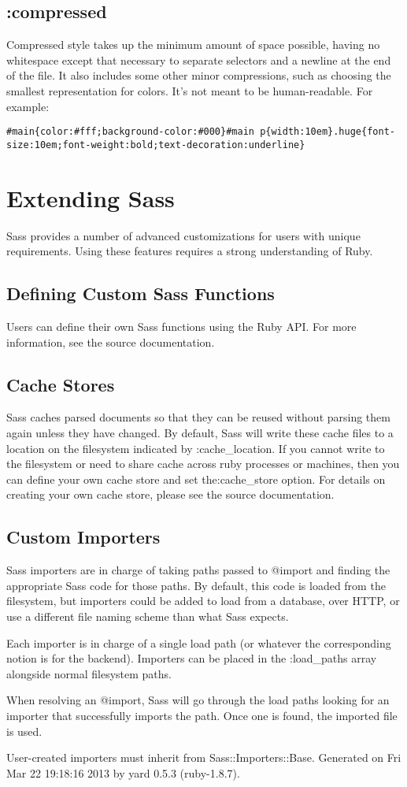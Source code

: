 \documentclass[9pt]{article}
\begin{document}
\subsection{:compressed}


 Compressed style takes up the minimum amount of space possible, having no whitespace except that necessary to separate selectors and a newline at the end of the file. It also includes some other minor compressions, such as choosing the smallest representation for colors. It’s not meant to be human-readable. For example:
\begin{verbatim}
#main{color:#fff;background-color:#000}#main p{width:10em}.huge{font-size:10em;font-weight:bold;text-decoration:underline}
\end{verbatim}
\section{Extending Sass}


 Sass provides a number of advanced customizations for users with unique requirements. Using these features requires a strong understanding of Ruby.
\subsection{Defining Custom Sass Functions}


 Users can define their own Sass functions using the Ruby API. For more information, see the source documentation.
\subsection{Cache Stores}


 Sass caches parsed documents so that they can be reused without parsing them again unless they have changed. By default, Sass will write these cache files to a location on the filesystem indicated by :cache\_location. If you cannot write to the filesystem or need to share cache across ruby processes or machines, then you can define your own cache store and set the:cache\_store option. For details on creating your own cache store, please see the source documentation.
\subsection{Custom Importers}


 Sass importers are in charge of taking paths passed to @import and finding the appropriate Sass code for those paths. By default, this code is loaded from the filesystem, but importers could be added to load from a database, over HTTP, or use a different file naming scheme than what Sass expects.


 Each importer is in charge of a single load path (or whatever the corresponding notion is for the backend). Importers can be placed in the :load\_paths array alongside normal filesystem paths.


 When resolving an @import, Sass will go through the load paths looking for an importer that successfully imports the path. Once one is found, the imported file is used.


 User-created importers must inherit from Sass::Importers::Base.
 Generated on Fri Mar 22 19:18:16 2013 by yard 0.5.3 (ruby-1.8.7). 
\end{document}
